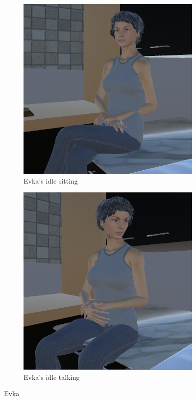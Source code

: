 \documentclass[18pt]{article}
\numberwithin{equation}{section} %
\numberwithin{figure}{section} %
\numberwithin{table}{section} %
\begin{document}
			\begin{figure}[H]
				\centering
				\begin{subfigure}{0.4\textwidth}
					\centering
					\includegraphics[width=1\linewidth]{images/Evka_sit_1}
					\caption{Evka's idle sitting}
				\end{subfigure}
				\begin{subfigure}{0.4\textwidth}
					\centering
					\includegraphics[width=0.96\linewidth]{images/Evka_sit_2}
					\caption{Evka's idle talking}
				\end{subfigure}		
				\caption{Evka}
				\label{fig:evkasit1}
			\end{figure}			
			
\end{document}
